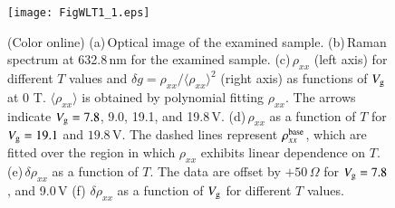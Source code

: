\documentclass[final,5p,times,twocolumn]{elsarticle}
\begin{document}
\begin{figure}  [t]
\texttt{[image: FigWLT1\_1.eps]}
\caption{\label{fig1}(Color online) (a)\,Optical image of the examined sample. (b)\,Raman spectrum at 632.8\,nm for the examined sample. (c)\,$\rho_{xx}$ (left axis) for different $T$ values and $\delta g = \rho_{xx}/\langle \rho_{xx} \rangle^2$ (right axis) as functions of $V_{\rm g}$ at 0 T. $\langle \rho_{xx} \rangle$ is obtained by polynomial fitting $\rho_{xx}$. The arrows indicate $V_{\rm g}=7.8$, 9.0, 19.1, and 19.8\,V. (d)\,$\rho_{xx}$ as a function of $T$ for $V_{\rm g}=19.1$ and $19.8$\,V. The dashed lines represent $\rho_{xx}^{\rm base}$, which are fitted over the region in which $\rho_{xx}$ exhibits linear dependence on $T$. (e)\,$\delta\rho_{xx}$ as a function of $T$. The data are offset by $+50$\,$\Omega$ for $V_{\rm g}=7.8$, and 9.0\,V (f) $\delta \rho_{xx} $ as a function of $V_{\rm g}$ for different $T$ values.}
\end{figure}
\end{document}
